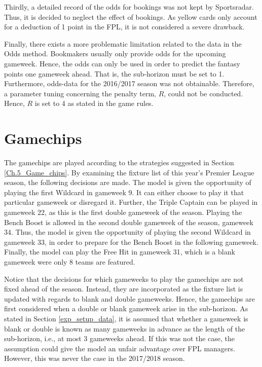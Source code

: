\newpar

Thirdly, a detailed record of the odds for bookings was not kept by Sportsradar. Thus, it is decided to neglect the effect of bookings. As yellow cards only account for a deduction of 1 point in the FPL, it is not considered a severe drawback.

\newpar

Finally, there exists a more problematic limitation related to the data in the Odds method. Bookmakers usually only provide odds for the upcoming gameweek. Hence, the odds can only be used in order to predict the fantasy points one gameweek ahead. That is, the sub-horizon must be set to 1. Furthermore, odds-data for the 2016/2017 season was not obtainable. Therefore, a parameter tuning concerning the penalty term, $R$, could not be conducted. Hence, $R$ is set to 4 as stated in the game rules.

\newpar



\section{Gamechips} \label{exp_setup_gamechips}

The gamechips are played according to the strategies suggested in Section \ref{Ch.5_Game_chips}. By examining the fixture list of this year's Premier League season, the following decisions are made. The model is given the opportunity of playing the first Wildcard in gameweek 9. It can either choose to play it that particular gameweek or disregard it. Further, the Triple Captain can be played in gameweek 22, as this is the first double gameweek of the season. Playing the Bench Boost is allowed in the second double gameweek of the season, gameweek 34. Thus, the model is given the opportunity of playing the second Wildcard in gameweek 33, in order to prepare for the Bench Boost in the following gameweek. Finally, the model can play the Free Hit in gameweek 31, which is a blank gameweek were only 8 teams are featured. 

\newpar

Notice that the decisions for which gameweeks to play the gamechips are not fixed ahead of the season. Instead, they are incorporated as the fixture list is updated with regards to blank and double gameweeks. Hence, the gamechips are first considered when a double or blank gameweek arise in the sub-horizon. As stated in Section \ref{exp_setup_data}, it is assumed that whether a gameweek is blank or double is known as many gameweeks in advance as the length of the sub-horizon, i.e., at most 3 gameweeks ahead. If this was not the case, the assumption could give the model an unfair advantage over FPL managers. However, this was never the case in the 2017/2018 season.


